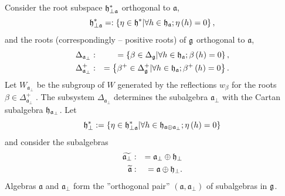 \documentclass[12pt]{iopart}
\theoremstyle{definition}
\newcommand{\af}{\mathfrak{a}}
\newcommand{\hf}{\mathfrak{h}}
\begin{document}
Consider the root subspace
$\frak{h}_{\perp \af}^{\ast }$ orthogonal to  $\af$,
\begin{equation*}
\frak{h}_{\perp \af}^{\ast }=:\left\{ \eta \in \frak{h}^{\ast }
|\forall h \in \hf_{\af};  \eta\left(h \right)=0 \right\} ,
\end{equation*}
and the roots (correspondingly -- positive roots) of $\frak{g}$ orthogonal
to $\af$,
\begin{eqnarray*}
\Delta _{\af_{\perp }} &:&=\left\{ \beta \in \Delta _{\frak{g}}|
\forall h \in \hf_{\af};  \beta\left(h \right)=0  \right\} , \\
\Delta _{\af_{\perp }}^{+} &:&=\left\{ \beta ^{+}\in \Delta _{\frak{g}%
}^{+}|\forall h \in \hf_{\af};  \beta^{+}\left(h \right)=0  \right\} .
\end{eqnarray*}
Let $W_{\af_{\perp }}$ be the subgroup of $W$ generated by the
reflections $w _{\beta }$ for the roots $\beta \in \Delta _{\af%
_{\perp }}^{+}$ . The subsystem $\Delta _{\af_{\perp }}$ determines the
subalgebra $\af_{\perp }$ with the Cartan subalgebra $\frak{h}_{\af%
_{\perp }}$. Let
\begin{equation*}
\frak{h}_{\perp }^{\ast }:=\left\{ \eta \in \frak{h}_{\perp \af}^{\ast
}|\forall h \in \hf_{\af\oplus \af_{\perp}}; \eta \left( h \right)=0 \right\}
\end{equation*}
and consider the subalgebras
\begin{eqnarray*}
\widetilde{\af_{\perp }} &:&=\af_{\perp }\oplus \frak{h}_{\perp }
\\
\widetilde{\af} &:&=\af\oplus \frak{h}_{\perp }.
\end{eqnarray*}
Algebras $\af$ and $\af_{\perp }$ form the ''orthogonal pair''
$\left( \af,\af_{\perp}\right) $
of subalgebras in $\frak{g}$.
\end{document}
